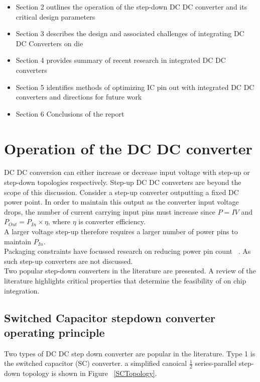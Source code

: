 \documentclass[letterpaper,twocolumn,10pt]{article}
\begin{document}
\begin{itemize}
\item{Section 2 outlines the operation of the step-down DC DC converter and its critical design parameters}
\item{Section 3 describes the design and associated challenges of integrating DC DC Converters on die}
\item{Section 4 provides summary of recent research in integrated DC DC converters}
\item{Section 5 identifies methods of optimizing IC pin out with integrated DC DC converters and directions for future work}
\item{Section 6 Conclusions of the report}
\end{itemize}
 


\section{Operation of the DC DC converter}

DC DC conversion can either increase or decrease input voltage with step-up or step-down topologies respectively. Step-up DC DC converters are beyond the scope of this discussion. Consider a step-up converter outputting a fixed DC power point. In order to maintain this output as the converter input voltage drops, the number of current carrying input pins must increase since $P = IV$ and $P_{Out} = P_{In}\times \eta$, where $\eta$ is converter efficiency.\\
A larger voltage step-up therefore requires a larger number of power pins to maintain $P_{In}$.\\ Packaging constraints have focussed research on reducing power pin count ~\cite{Marbell2011}. As such step-up converters are not discussed.\\
\indent Two popular step-down converters in the literature are presented. A review of the literature highlights critical properties that determine the feasibility of on chip integration.

\subsection{Switched Capacitor stepdown converter operating principle}\label{SCOpPrinciple}
Two types of DC DC step down converter are popular in the literature. Type 1 is the switched capacitor (SC) converter. a simplified canoical $\frac{1}{2}$ series-parallel step-down topology is shown in Figure ~\ref{SCTopology}.\\
\end{document}
